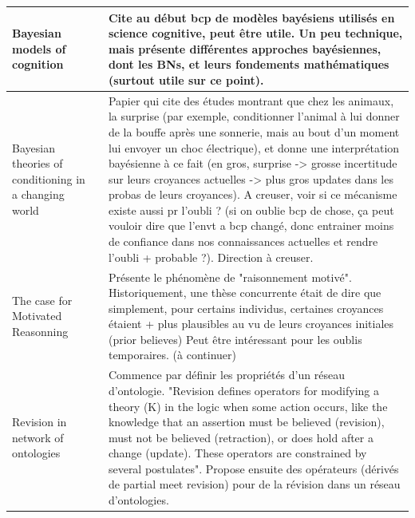 \documentclass[french]{article}
\begin{document}
\begin{table}[ht!]
\begin{center}
\begin{tabular}{|p{}|p{}|p{}|}
            \\
            \hline
            Bayesian models of cognition \cite{l_griffiths_bayesian_2008}
            &
            & Cite au début bcp de modèles bayésiens utilisés en science cognitive, peut être utile. Un peu technique, mais présente différentes approches bayésiennes, dont les BNs, et leurs fondements mathématiques (surtout utile sur ce point).
            \\
            \hline
            Bayesian theories of conditioning in a changing world \cite{courville_bayesian_2006}
            &
            & Papier qui cite des études montrant que chez les animaux, la surprise (par exemple, conditionner l'animal à lui donner de la bouffe après une sonnerie, mais au bout d'un moment lui envoyer un choc électrique), et donne une interprétation bayésienne à ce fait (en gros, surprise -> grosse incertitude sur leurs croyances actuelles -> plus gros updates dans les probas de leurs croyances). A creuser, voir si ce mécanisme existe aussi pr l'oubli ? (si on oublie bcp de chose, ça peut vouloir dire que l'envt a bcp changé, donc entrainer moins de confiance dans nos connaissances actuelles et rendre l'oubli + probable ?). Direction à creuser.
            \\
            \hline

            The case for Motivated Reasonning \cite{kunda1990case}
            &
            & Présente le phénomène de "raisonnement motivé". Historiquement, une thèse concurrente était de dire que simplement, pour certains individus, certaines croyances étaient + plus plausibles au vu de leurs croyances initiales (prior believes) Peut être intéressant pour les oublis temporaires. (à continuer)
            \\
            \hline

            Revision in network of ontologies \cite{euzenat_revision_2015}
            & 
            & Commence par définir les propriétés d'un réseau d'ontologie. "Revision defines operators for modifying a theory (K) in the logic when some action occurs, like the knowledge that an assertion must be believed (revision), must not be believed (retraction), or does hold after a change (update). These operators are constrained by several postulates". Propose ensuite des opérateurs (dérivés de partial meet revision) pour de la révision dans un réseau d'ontologies.

            \\
            \hline
        \end{tabular}
    \end{center}
    \end{table}
\end{document}
